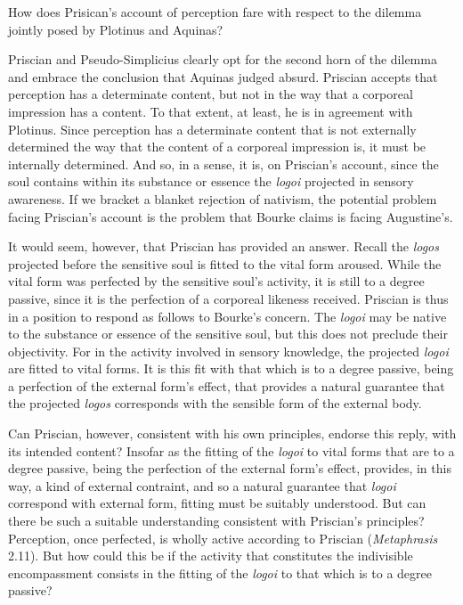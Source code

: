 \documentclass[12pt]{article}
\begin{document}
How does Prisican's account of perception fare with respect to the dilemma jointly posed by Plotinus and Aquinas?

Priscian and Pseudo-Simplicius clearly opt for the second horn of the dilemma and embrace the conclusion that Aquinas judged absurd. Priscian accepts that perception has a determinate content, but not in the way that a corporeal impression has a content. To that extent, at least, he is in agreement with Plotinus. Since perception has a determinate content that is not externally determined the way that the content of a corporeal impression is, it must be internally determined. And so, in a sense, it is, on Priscian's account, since the soul contains within its substance or essence the \emph{logoi} projected in sensory awareness. If we bracket a blanket rejection of nativism, the potential problem facing Priscian's account is the problem that Bourke claims is facing Augustine's.

It would seem, however, that Priscian has provided an answer. Recall the \emph{logos} projected before the sensitive soul is fitted to the vital form aroused. While the vital form was perfected by the sensitive soul's activity, it is still to a degree passive, since it is the perfection of a corporeal likeness received. Priscian is thus in a position to respond as follows to Bourke's concern. The \emph{logoi} may be native to the substance or essence of the sensitive soul, but this does not preclude their objectivity. For in the activity involved in sensory knowledge, the projected \emph{logoi} are fitted to vital forms. It is this fit with that which is to a degree passive, being a perfection of the external form's effect, that provides a natural guarantee that the projected \emph{logos} corresponds with the sensible form of the external body.

Can Priscian, however, consistent with his own principles, endorse this reply, with its intended content? Insofar as the fitting of the \emph{logoi} to vital forms that are to a degree passive, being the perfection of the external form's effect, provides, in this way, a kind of external contraint, and so a natural guarantee that \emph{logoi} correspond with external form, fitting must be suitably understood. But can there be such a suitable understanding consistent with Priscian's principles? Perception, once perfected, is wholly active according to Priscian (\emph{Metaphrasis} 2.11). But how could this be if the activity that constitutes the indivisible encompassment consists in the fitting of the \emph{logoi} to that which is to a degree passive?
\end{document}
